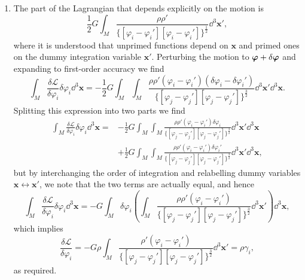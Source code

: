 \documentclass[a4paper,10pt]{paper}
\begin{document}
\begin{enumerate}
\item The part of the Lagrangian that depends explicitly on the motion is
\begin{equation*}
    \frac{1}{2}G\int_{M}\frac{\rho\rho'}{\{[\varphi_{i}-\varphi_{i}'][ \varphi_{i}-\varphi_{i}']\}^{\frac{1}{2}}}\dd^{3}\mathbf{x}',
\end{equation*}
where it is understood that unprimed functions depend on $\mathbf{x}$ and primed ones on the dummy integration variable $\mathbf{x}'$. Perturbing the motion to $\bm{\varphi}+\delta\bm{\varphi}$ and expanding to first-order accuracy we find
\begin{equation*}
    \int_{M}\frac{\delta\mathcal{L}}{\delta\varphi_{i}}\delta\varphi_{i}\dd^{3}\mathbf{x}=-\frac{1}{2}G\int_{M}\int_{M}\frac{\rho\rho'(\varphi_{i}-\varphi_{i}')(\delta\varphi_{i}-\delta\varphi_{i}')}{\{[\varphi_{j}-\varphi_{j}'][ \varphi_{j}-\varphi_{j}']\}^{\frac{3}{2}}}\dd^{3}\mathbf{x}'\dd^{3}\mathbf{x}.
\end{equation*}
Splitting this expression into two parts we find
\begin{align*}
    \int_{M}\frac{\delta\mathcal{L}}{\delta\varphi_{i}}\delta\varphi_{i}\dd^{3}\mathbf{x} = &-\frac{1}{2}G\int_{M}\int_{M}\frac{\rho\rho'(\varphi_{i}-\varphi_{i}')\delta\varphi_{i}}{\{[\varphi_{j}-\varphi_{j}'][ \varphi_{j}-\varphi_{j}']\}^{\frac{3}{2}}}\dd^{3}\mathbf{x}'\dd^{3}\mathbf{x} \\
    &+\frac{1}{2}G\int_{M}\int_{M}\frac{\rho\rho'(\varphi_{i}-\varphi_{i}')\delta\varphi_{i}'}{\{[\varphi_{j}-\varphi_{j}'][ \varphi_{j}-\varphi_{j}']\}^{\frac{3}{2}}}\dd^{3}\mathbf{x}'\dd^{3}\mathbf{x},
\end{align*}
but by interchanging the order of integration and relabelling dummy variables $\mathbf{x} \leftrightarrow \mathbf{x}'$, we note that the two terms are actually equal, and hence
\begin{equation*}
    \int_{M}\frac{\delta\mathcal{L}}{\delta\varphi_{i}}\delta\varphi_{i}\dd^{3}\mathbf{x}=-G\int_{M}\delta\varphi_{i} \left( \int_{M}\frac{\rho\rho'(\varphi_{i}-\varphi_{i}')}{\{[\varphi_{j}-\varphi_{j}'][ \varphi_{j}-\varphi_{j}']\}^{\frac{3}{2}}}\dd^{3}\mathbf{x}' \right) \dd^{3}\mathbf{x},
\end{equation*}
which implies
\begin{equation*}
    \frac{\delta\mathcal{L}}{\delta\varphi_{i}}=-G\rho\int_{M}\frac{\rho'(\varphi_{i}-\varphi_{i}')}{\{[\varphi_{j}-\varphi_{j}'][ \varphi_{j}-\varphi_{j}']\}^{\frac{3}{2}}}\dd^{3}\mathbf{x}'=\rho\gamma_{i},
\end{equation*}
as required.


\end{enumerate}
\end{document}
